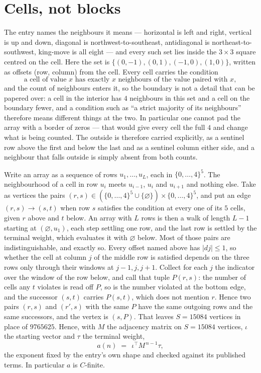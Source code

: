 \documentclass[11pt,a4paper]{article}
\theoremstyle{plain}
\theoremstyle{definition}
\begin{document}
\section{Cells, not blocks}

The entry names the neighbours it means --- horizontal is left and right, vertical is up and
down, diagonal is northwest-to-southeast, antidiagonal is northeast-to-southwest, king-move is
all eight --- and every such set lies inside the $3\times3$ square centred on the cell. Here
the set is $\{(0,-1), (0,1), (-1,0), (1,0)\}$, written as offsets (row, column) from the cell. Every cell carries
the condition
\[
\text{a cell of value }x\text{ has exactly }x\text{ neighbours of the value paired with }x,
\]
and the count of neighbours enters it, so the boundary is not a detail that can be papered
over: a cell in the interior has $4$ neighbours in this set and a cell on the boundary
fewer, and a condition such as ``a strict majority of its neighbours'' therefore means
different things at the two. In particular one cannot pad the array with a border of zeros ---
that would give every cell the full $4$ and change what is being counted. The outside is
therefore carried
explicitly, as a sentinel row above the first and below the last and as a sentinel column
either side, and a neighbour that falls outside is simply absent from both counts.

Write an array as a sequence of rows $u_1,\dots,u_L$, each in
$\{0,\dots,4\}^{5}$. The neighbourhood of a cell in row $u_i$ meets $u_{i-1}$,
$u_i$ and $u_{i+1}$ and nothing else. Take as vertices the pairs
$(r,s)\in(\{0,\dots,4\}^{5}\cup\{\varnothing\})\times\{0,\dots,4\}^{5}$,
and put an edge $(r,s)\to(s,t)$ when row $s$ satisfies the condition at every one of its
$5$ cells, given $r$ above and $t$ below. An array with $L$ rows is then a walk of length
$L-1$ starting at $(\varnothing,u_1)$, each step settling one row, and the last row is
settled by the terminal weight, which evaluates it with $\varnothing$ below. Most of those pairs are indistinguishable, and exactly so. Every offset named above has $|dj|\le 1$, so whether the cell at column $j$ of the middle row is satisfied depends on the three rows only through their windows at $j-1,j,j+1$. Collect for each $j$ the indicator over the window of the row below, and call that tuple $P(r,s)$: the number of cells any $t$ violates is read off $P$, so is the number violated at the bottom edge, and the successor $(s,t)$ carries $P(s,t)$, which does not mention $r$. Hence two pairs $(r,s)$ and $(r',s)$ with the same $P$ have the same outgoing rows and the same successors, and the vertex is $(s,P)$. That leaves $S=15084$ vertices in place of $9765625$. Hence,
with $M$ the adjacency matrix on $S=15084$ vertices, $\iota$ the starting vector and $\tau$ the
terminal weight,
\[
a(n)\;=\;\,\iota^{\!\top}M^{\,n-1}\tau ,
\]
the exponent fixed by the entry's own shape and checked against its published terms. In
particular $a$ is $C$-finite.
\end{document}
